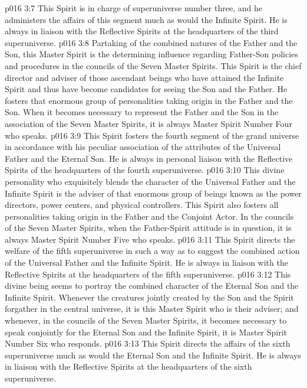 \vs p016 3:7 This Spirit is in charge of superuniverse number three, and he administers the affairs of this segment much as would the Infinite Spirit. He is always in liaison with the Reflective Spirits at the headquarters of the third superuniverse.
\vs p016 3:8 \pc {} Partaking of the combined natures of the Father and the Son, this Master Spirit is the determining influence regarding Father\hyp{}Son policies and procedures in the councils of the Seven Master Spirits. This Spirit is the chief director and adviser of those ascendant beings who have attained the Infinite Spirit and thus have become candidates for seeing the Son and the Father. He fosters that enormous group of personalities taking origin in the Father and the Son. When it becomes necessary to represent the Father and the Son in the association of the Seven Master Spirits, it is always Master Spirit Number Four who speaks.
\vs p016 3:9 This Spirit fosters the fourth segment of the grand universe in accordance with his peculiar association of the attributes of the Universal Father and the Eternal Son. He is always in personal liaison with the Reflective Spirits of the headquarters of the fourth superuniverse.
\vs p016 3:10 \pc {} This divine personality who exquisitely blends the character of the Universal Father and the Infinite Spirit is the adviser of that enormous group of beings known as the power directors, power centers, and physical controllers. This Spirit also fosters all personalities taking origin in the Father and the Conjoint Actor. In the councils of the Seven Master Spirits, when the Father\hyp{}Spirit attitude is in question, it is always Master Spirit Number Five who speaks.
\vs p016 3:11 This Spirit directs the welfare of the fifth superuniverse in such a way as to suggest the combined action of the Universal Father and the Infinite Spirit. He is always in liaison with the Reflective Spirits at the headquarters of the fifth superuniverse.
\vs p016 3:12 \pc {} This divine being seems to portray the combined character of the Eternal Son and the Infinite Spirit. Whenever the creatures jointly created by the Son and the Spirit forgather in the central universe, it is this Master Spirit who is their adviser; and whenever, in the councils of the Seven Master Spirits, it becomes necessary to speak conjointly for the Eternal Son and the Infinite Spirit, it is Master Spirit Number Six who responds.
\vs p016 3:13 This Spirit directs the affairs of the sixth superuniverse much as would the Eternal Son and the Infinite Spirit. He is always in liaison with the Reflective Spirits at the headquarters of the sixth superuniverse.

